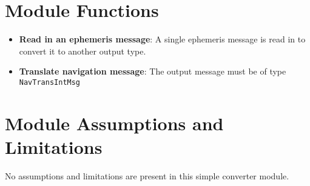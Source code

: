 

\section{Module Functions}
\begin{itemize}
	\item \textbf{Read in an ephemeris message}: A single ephemeris message is read in to convert it to another output type.
	\item \textbf{Translate navigation message}: The output message must be of type {\tt NavTransIntMsg}
\end{itemize}

\section{Module Assumptions and Limitations}
No assumptions and limitations are present in this simple converter module.